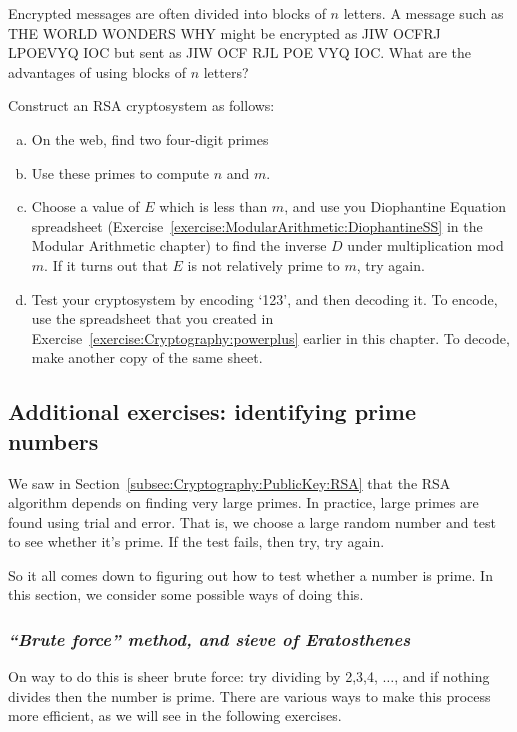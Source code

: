 \begin{exercise}{} 
Encrypted messages are often divided into blocks of $n$ letters. A
message such as THE WORLD WONDERS WHY might be encrypted as 
JIW OCFRJ LPOEVYQ IOC but sent as JIW OCF RJL POE VYQ
IOC.  What are the advantages of using blocks of $n$ letters? 
 \end{exercise}
 
 
\begin{exercise}{}
Construct an RSA cryptosystem as follows:
\begin{enumerate}[(a)]
\item
On the web, find two four-digit primes
\item
Use these primes to compute $n$ and $m$.
\item
Choose a value of $E$ which is less than $m$, and use you Diophantine Equation spreadsheet (Exercise~\ref{exercise:ModularArithmetic:DiophantineSS} in the Modular Arithmetic chapter) to find the inverse $D$ under multiplication mod $m$.  If it turns out that $E$ is not relatively prime to $m$, try again.
\item
Test your cryptosystem by encoding `123', and then decoding it. To encode, use the spreadsheet that you 
created in Exercise~\ref{exercise:Cryptography:powerplus} earlier in this chapter. To decode, make another copy of the same sheet.
\end{enumerate}
\end{exercise} 
 
 
\subsection{Additional exercises: identifying prime numbers\quad
{}}
\label{subsec:Cryptography:PublicKey:Primality}
 
We saw in Section~\ref{subsec:Cryptography:PublicKey:RSA} that the RSA algorithm depends on finding very large primes. In practice, large primes are found using trial and error. That is, we choose a large random number and test to see whether it's prime. 
If the test fails, then try, try again.

So it all comes down to figuring out how to test whether a number is prime. In this section, we consider some possible ways of doing this.

\subsubsection*{\emph{``Brute force'' method, and sieve of Eratosthenes}}
On way to do this is sheer brute force: try dividing by 2,3,4, $\ldots$, and if nothing divides then the number is prime. There are various ways to make this process more efficient, as we will see in the following exercises.

